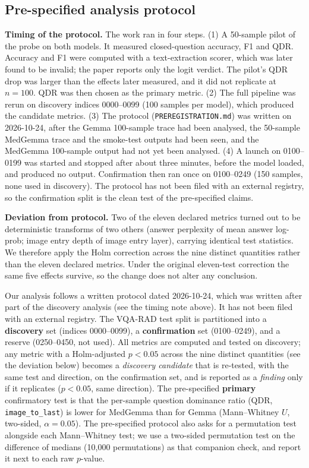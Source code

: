 \subsection{Pre-specified analysis protocol}
\label{sec:hypotheses}

\textbf{Timing of the protocol.} The work ran in four steps. (1) A 50-sample pilot of the probe on both models. It measured closed-question accuracy,
F1 and QDR. Accuracy and F1 were computed with a text-extraction scorer, which was later
found to be invalid; the paper reports only the logit verdict. The pilot's QDR drop was
larger than the effects later measured, and it did not replicate at $n{=}100$. QDR was then
chosen as the primary metric. (2) The full pipeline was rerun on discovery indices 0000--0099 (100
samples per model), which produced the candidate metrics. (3) The protocol
(\texttt{PREREGISTRATION.md}) was written on 2026-10-24, after the Gemma 100-sample trace
had been analysed, the 50-sample MedGemma trace and the smoke-test outputs had been seen, and the MedGemma 100-sample output had not yet been analysed. (4) A launch on
0100--0199 was started and stopped after about three minutes, before the model loaded, and
produced no output. Confirmation then ran once on 0100--0249 (150 samples, none used in
discovery). The protocol has not been filed with an external registry, so the confirmation split is the clean test of the
pre-specified claims.

\textbf{Deviation from protocol.} Two of the eleven declared metrics turned out to be
deterministic transforms of two others (answer perplexity of mean answer log-prob;
image entry depth of image entry layer), carrying identical test statistics. We
therefore apply the Holm correction across the nine distinct quantities rather than the
eleven declared metrics. Under the original eleven-test correction the same five effects
survive, so the change does not alter any conclusion.

Our analysis follows a written protocol dated 2026-10-24, which was written after part of the discovery analysis (see the timing note above). It has not been filed with an external registry. The VQA-RAD test split is partitioned into a
\textbf{discovery} set (indices 0000--0099), a \textbf{confirmation} set
(0100--0249), and a reserve (0250--0450, not used). All metrics are computed and tested on discovery; any
metric with a Holm-adjusted $p<0.05$ across the nine distinct quantities (see the deviation below) becomes a
\emph{discovery candidate} that is re-tested, with the same test and direction, on the
confirmation set, and is reported as a \emph{finding} only if it replicates
($p<0.05$, same direction). The pre-specified \textbf{primary} confirmatory test is
that the per-sample question dominance ratio (QDR, \texttt{image\_to\_last}) is lower
for MedGemma than for Gemma (Mann--Whitney $U$, two-sided, $\alpha{=}0.05$). The
pre-specified protocol also asks for a permutation test alongside each Mann--Whitney test; we
use a two-sided permutation test on the difference of medians (10{,}000 permutations) as
that companion check, and report it next to each raw $p$-value.

